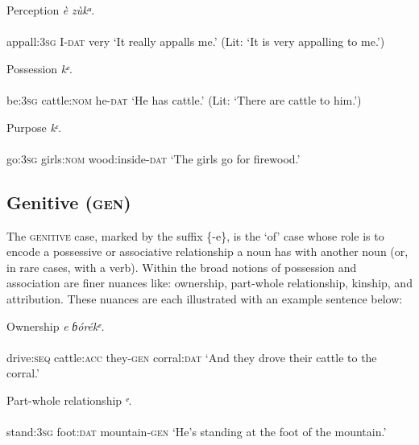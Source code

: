 Perception
\ea\label{ex:}
\textit{è}\textit{   zùkᵘ.} \\
    \\
appall:\textsc{3sg}   I-\textsc{dat}   very
\glt ‘It really appalls me.’ (Lit: ‘It is very appalling to me.’) 
\z




Possession
\ea\label{ex:}
\textit{kᵉ}. \\
    \\
be:\textsc{3sg}   cattle:\textsc{nom}    he-\textsc{dat}
\glt ‘He has cattle.’ (Lit: ‘There are cattle to him.’) 
\z




Purpose
\ea\label{ex:}
\textit{kᵋ}. \\
    \\
go:\textsc{3sg}   girls:\textsc{nom}   wood:inside-\textsc{dat}
\glt ‘The girls go for firewood.’ 
\z






\subsection{Genitive (\textsc{gen})}


The \textsc{genitive} case, marked by the suffix \{-e\}, is the ‘of’ case whose role is to encode a possessive or associative relationship a noun has with another noun (or, in rare cases, with a verb). Within the broad notions of possession and association are finer nuances like: ownership, part-whole relationship, kinship, and attribution. These nuances are each illustrated with an example sentence below:




Ownership
\ea\label{ex:}
\textit{e}\textit{     ɓórékᵉ.} \\
    \\
drive:\textsc{seq}   cattle:\textsc{acc}   they-\textsc{gen}   corral:\textsc{dat}
\glt ‘And they drove their cattle to the corral.’ 
\z




Part-whole relationship
\ea\label{ex:}
\textit{ᵉ}. \\
    \\
stand:\textsc{3sg}   foot:\textsc{dat}   mountain-\textsc{gen}
\glt ‘He’s standing at the foot of the mountain.’ 
\z




